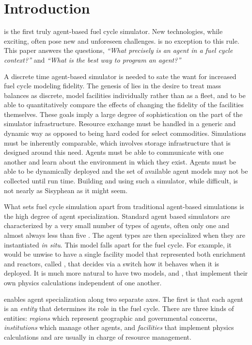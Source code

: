 \section{Introduction}
\label{sec-intro}

\Cyclus \citeme is the first truly agent-based \citeme fuel cycle simulator. 
New technologies, while exciting, often pose new and unforeseen challenges.
\Cyclus is no exception to this rule.  This paper answers the questions,
\emph{``What precisely is an agent in a fuel cycle context?''} and 
\emph{``What is the best way to program an agent?''}

A discrete time agent-based simulator is needed to sate the want for increased 
fuel cycle modeling fidelity. The genesis of \cyclus lies in the desire to 
treat mass balances as discrete, model facilities individually rather than as 
a fleet, and to be able to quantitatively compare the effects of changing the 
fidelity of the facilities themselves. These goals imply a large degree of 
sophistication on the part of the simulator infrastructure.  Resource exchange
must be handled in a generic and dynamic way as opposed to being hard coded 
for select commodities. Simulations must be inherently comparable, which involves 
storage infrastructure that is designed around this need. Agents must be able 
to communicate with one another and learn about the environment in which they 
exist. Agents must be able to be dynamically deployed and the set of 
available agent models may not be collected until run time. Building and using such a
simulator, while difficult, is not nearly as Sisyphean as it might seem. 

What sets fuel cycle simulation apart from traditional agent-based simulations 
is the high degree of agent specialization. Standard agent based simulators
are characterized by a very small number of types of agents, often only one and 
almost always less than five \citeme. The agent types are then specialized 
when they are instantiated \emph{in situ}. This model falls apart for the 
fuel cycle.  For example, it would be unwise to have a single facility model 
that represented both enrichment and reactors, called ,
that decides via a switch how it behaves when it is deployed. It is much 
more natural to have two models,  and , 
that implement their own physics calculations independent of one another.

\Cyclus enables agent specialization along two separate axes. The first is 
that each agent is an \emph{entity} that determines its role in the 
fuel cycle. There are three kinds of entities: \emph{regions} which 
represent geographic and governmental concerns, \emph{institutions} 
which manage other agents, and \emph{facilities} that implement 
physics calculations and are usually in charge of resource management.

